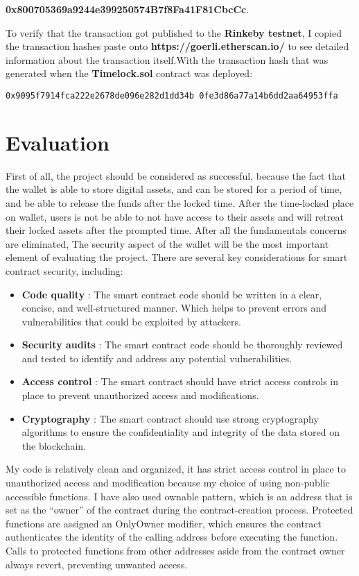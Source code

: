\documentclass[10pt,twocolumn]{article}
\begin{document}
\textbf{0x800705369a9244e399250574B7f8Fa41F81CbcCc}.

To verify that the transaction got published to the \textbf{Rinkeby testnet}, I copied the
transaction hashes paste onto \textbf{https://goerli.etherscan.io/} to see detailed information about the transaction itself.With the transaction hash that was generated when the \textbf{Timelock.sol} contract was deployed: 

\texttt{0x9095f7914fca222e2678de096e282d1dd34b
0fe3d86a77a14b6dd2aa64953ffa}

\section{Evaluation}

First of all, the project should be considered as successful, because the fact that the wallet is able to store digital assets, and can be stored for a period of time, and be able to release the funds after the locked time. After the time-locked place on wallet, users is not be able to not have access to their assets and will retreat their locked assets after the prompted time. After all the fundamentals concerns are eliminated, The security aspect of the wallet will be the most important element of evaluating the project. There are several key considerations for smart contract security, including:
\begin{itemize}
    \item \textbf{Code quality} : The smart contract code should be written in a clear, concise, and well-structured manner. Which helps to prevent errors and vulnerabilities that could be exploited by attackers.
    \item \textbf{Security audits} : The smart contract code should be thoroughly reviewed and tested to identify and address any potential vulnerabilities.
    \item \textbf{Access control} : The smart contract should have strict access controls in place to prevent unauthorized access and modifications.
    \item \textbf{Cryptography} : The smart contract should use strong cryptography algorithms to ensure the confidentiality and integrity of the data stored on the blockchain.
\end{itemize}

My code is relatively clean and organized, it has strict access control in place to unauthorized access and modification because my choice of using non-public accessible functions. 
I have also used ownable pattern, which is an address that is set as the “owner” of the contract during the contract-creation process. Protected functions are assigned an OnlyOwner modifier, which ensures the contract authenticates the identity of the calling address before executing the function. Calls to protected functions from other addresses aside from the contract owner always revert, preventing unwanted access.
\end{document}
